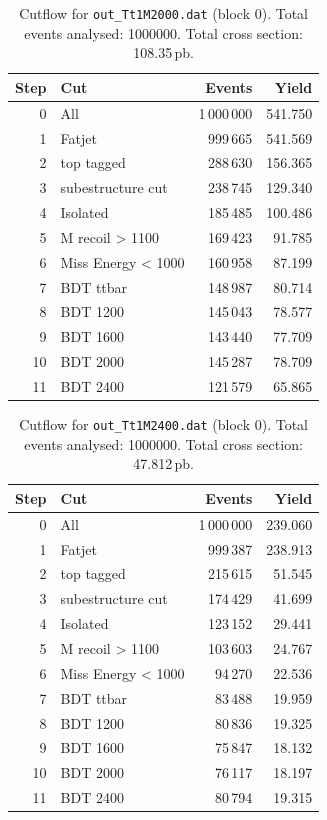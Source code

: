 \documentclass{article}
\begin{document}
\begin{table}[H]
\centering
\begin{tabular}{r l r r}
\toprule
Step & Cut & Events & Yield \\
\midrule
0 & All & 1\,000\,000 & 541.750 \\
1 & Fatjet & 999\,665 & 541.569 \\
2 & top tagged & 288\,630 & 156.365 \\
3 & subestructure cut & 238\,745 & 129.340 \\
4 & Isolated & 185\,485 & 100.486 \\
5 & M recoil > 1100 & 169\,423 & 91.785 \\
6 & Miss Energy < 1000 & 160\,958 & 87.199 \\
7 & BDT ttbar & 148\,987 & 80.714 \\
8 & BDT 1200 & 145\,043 & 78.577 \\
9 & BDT 1600 & 143\,440 & 77.709 \\
10 & BDT 2000 & 145\,287 & 78.709 \\
11 & BDT 2400 & 121\,579 & 65.865 \\
\bottomrule
\end{tabular}
\caption{Cutflow for \texttt{out\_Tt1M2000.dat} (block 0). Total events analysed: 1000000. Total cross section: 108.35\,pb.}
\label{tab:cutflow-out-Tt1M2000-dat}
\end{table}

\begin{table}[H]
\centering
\begin{tabular}{r l r r}
\toprule
Step & Cut & Events & Yield \\
\midrule
0 & All & 1\,000\,000 & 239.060 \\
1 & Fatjet & 999\,387 & 238.913 \\
2 & top tagged & 215\,615 & 51.545 \\
3 & subestructure cut & 174\,429 & 41.699 \\
4 & Isolated & 123\,152 & 29.441 \\
5 & M recoil > 1100 & 103\,603 & 24.767 \\
6 & Miss Energy < 1000 & 94\,270 & 22.536 \\
7 & BDT ttbar & 83\,488 & 19.959 \\
8 & BDT 1200 & 80\,836 & 19.325 \\
9 & BDT 1600 & 75\,847 & 18.132 \\
10 & BDT 2000 & 76\,117 & 18.197 \\
11 & BDT 2400 & 80\,794 & 19.315 \\
\bottomrule
\end{tabular}
\caption{Cutflow for \texttt{out\_Tt1M2400.dat} (block 0). Total events analysed: 1000000. Total cross section: 47.812\,pb.}
\label{tab:cutflow-out-Tt1M2400-dat}
\end{table}
\end{document}
